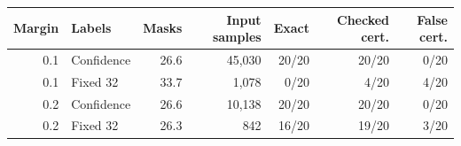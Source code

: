 \begin{tabular}{rlrrrrr}
\toprule
Margin & Labels & Masks & Input samples & Exact & Checked cert. & False cert. \\
\midrule
0.1 & Confidence & 26.6 & 45,030 & 20/20 & 20/20 & 0/20 \\
0.1 & Fixed 32 & 33.7 & 1,078 & 0/20 & 4/20 & 4/20 \\
0.2 & Confidence & 26.6 & 10,138 & 20/20 & 20/20 & 0/20 \\
0.2 & Fixed 32 & 26.3 & 842 & 16/20 & 19/20 & 3/20 \\
\bottomrule
\end{tabular}
